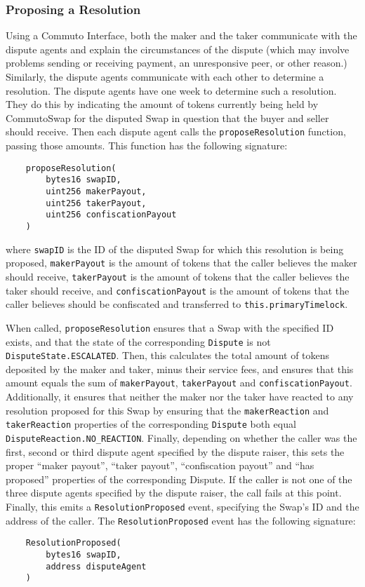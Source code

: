 \documentclass[11pt]{article}
\begin{document}
    \subsubsection*{Proposing a Resolution}
    Using a Commuto Interface, both the maker and the taker communicate with the dispute agents and
    explain the circumstances of the dispute (which may involve problems sending or receiving
    payment, an unresponsive peer, or other reason.) Similarly, the dispute agents communicate with
    each other to determine a resolution.
    The dispute agents have one week to determine such a resolution.
    They do this by indicating the amount of tokens currently being held by CommutoSwap for the
    disputed Swap in question that the buyer and seller should receive.
    Then each dispute agent calls the \verb|proposeResolution| function, passing those amounts.
    This function has the following signature:
    \begin{verbatim}
    proposeResolution(
        bytes16 swapID,
        uint256 makerPayout,
        uint256 takerPayout,
        uint256 confiscationPayout
    )
    \end{verbatim}
    where \verb|swapID| is the ID of the disputed Swap for which this resolution is being proposed,
    \verb|makerPayout| is the amount of tokens that the caller believes the maker should receive,
    \verb|takerPayout| is the amount of tokens that the caller believes the taker should receive,
    and \verb|confiscationPayout| is the amount of tokens that the caller believes should be
    confiscated and transferred to \verb|this.primaryTimelock|.

    When called, \verb|proposeResolution| ensures that a Swap with the specified ID exists, and that
    the state of the corresponding \verb|Dispute| is not \verb|DisputeState.ESCALATED|.
    Then, this calculates the total amount of tokens deposited by the maker and taker, minus their
    service fees, and ensures that this amount equals the sum of \verb|makerPayout|,
    \verb|takerPayout| and \verb|confiscationPayout|.
    Additionally, it ensures that neither the maker nor the taker have reacted to any resolution
    proposed for this Swap by ensuring that the \verb|makerReaction| and \verb|takerReaction|
    properties of the corresponding \verb|Dispute| both equal \verb|DisputeReaction.NO_REACTION|.
    Finally, depending on whether the caller was the first, second or third dispute agent specified
    by the dispute raiser, this sets the proper ``maker payout'', ``taker payout'', ``confiscation
    payout'' and ``has proposed'' properties of the corresponding Dispute.
    If the caller is not one of the three dispute agents specified by the dispute raiser, the call
    fails at this point.
    Finally, this emits a \verb|ResolutionProposed| event, specifying the Swap's ID and the address
    of the caller.
    The \verb|ResolutionProposed| event has the following signature:
    \begin{verbatim}
    ResolutionProposed(
        bytes16 swapID,
        address disputeAgent
    )
    \end{verbatim}
\end{document}
